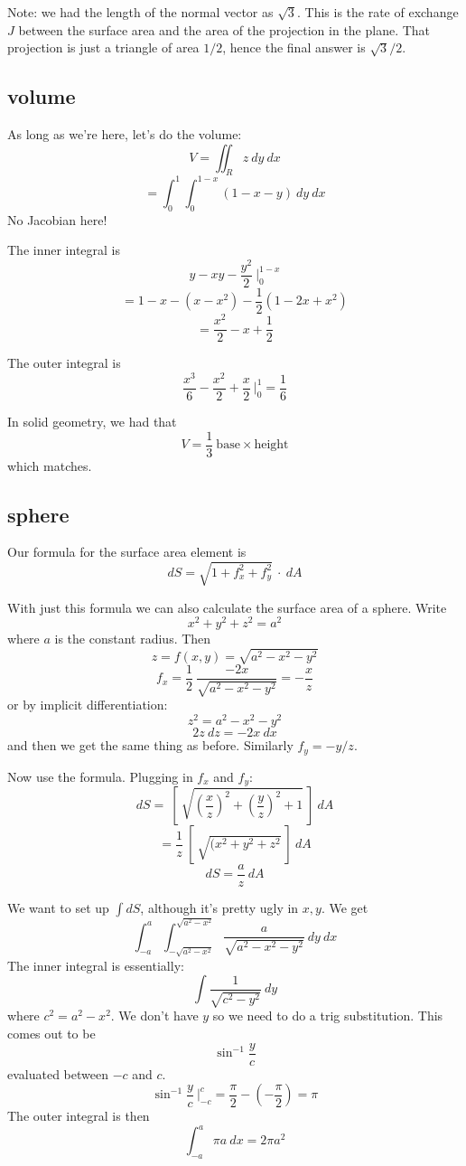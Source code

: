 \documentclass[11pt, oneside]{article}   	%
\begin{document}
Note:  we had the length of the normal vector as $\sqrt{3}$.  This is the rate of exchange $J$ between the surface area and the area of the projection in the plane.  That projection is just a triangle of area $1/2$, hence the final answer is $\sqrt{3}/2$.

\subsection*{volume}

As long as we're here, let's do the volume:
\[ V = \iint_R z \ dy \ dx \]
\[ = \int_0^1 \int_0^{1-x} (1 - x - y) \ dy \ dx \]
No Jacobian here!

The inner integral is
\[ y - xy - \frac{y^2}{2} \ \bigg |_0^{1-x} \]
\[ = 1 - x - (x - x^2) - \frac{1}{2} (1 - 2x + x^2) \]
\[ = \frac{x^2}{2} - x + \frac{1}{2} \]

The outer integral is
\[ \frac{x^3}{6} - \frac{x^2}{2} + \frac{x}{2} \ \bigg |_0^1 = \frac{1}{6} \]

In solid geometry, we had that
\[ V = \frac{1}{3} \ \text{base} \times \text{height} \]
which matches.
 
\subsection*{sphere}
Our formula for the surface area element is
\[ dS =  \sqrt{1 + f_x^2 + f_y^2} \  \cdot \ dA \]

With just this formula we can also calculate the surface area of a sphere.  Write
\[ x^2 + y^2 + z^2 = a^2 \]
where $a$ is the constant radius.  Then
\[ z = f(x,y) = \sqrt{a^2 - x^2 - y^2} \]
\[ f_x = \frac{1}{2} \ \frac{-2x}{\sqrt{a^2 - x^2 - y^2}} = -\frac{x}{z} \]
or by implicit differentiation:
\[ z^2 = a^2 - x^2 - y^2 \]
\[ 2 z \ dz = - 2 x \ dx \]
and then we get the same thing as before.  Similarly $f_y = -y/z$.

Now use the formula.  Plugging in $f_x$ and $f_y$:
\[ dS = \ [ \ \sqrt{(\frac{x}{z})^2 + (\frac{y}{z})^2 + 1} \  ] \ dA \]
\[ = \frac{1}{z}  \ [ \ \sqrt{(x^2 + y^2 + z^2} \  ] \ dA \]
\[ dS = \frac{a}{z} \ dA \]

We want to set up $\int dS$, although it's pretty ugly in $x,y$.  We get
\[ \int_{-a}^a \int_{-\sqrt{a^2-x^2}}^{\sqrt{a^2-x^2}} \frac{a}{\sqrt{a^2 - x^2 -y^2}} \ dy \ dx \]
The inner integral is essentially:
\[ \int \frac{1}{\sqrt{c^2 -y^2}} \ dy \]
where $c^2 = a^2 - x^2$.  We don't have $y$ so we need to do a trig substitution.  This comes out to be
\[ \sin^{-1} \frac{y}{c} \]
evaluated between $-c$ and $c$.  
\[ \sin^{-1} \frac{y}{c} \  \bigg |_{-c}^c = \frac{\pi}{2} - (- \frac{\pi}{2}) = \pi  \]
The outer integral is then
\[ \int_{-a}^a \pi a \ dx = 2 \pi a^2 \]
\end{document}
